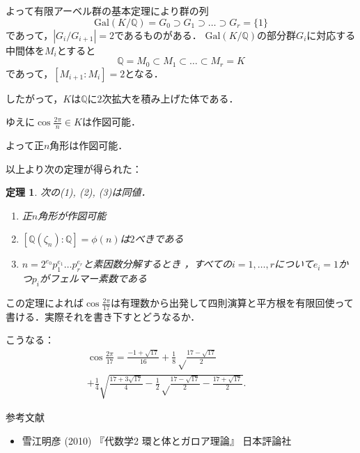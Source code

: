\documentclass[dvipdfmx,17pt]{beamer}
\theoremstyle{plain}
\newtheorem{thm}{定理}
\newcommand{\Q}{\mathbb{Q}}
\begin{document}
\begin{frame}
よって有限アーベル群の基本定理により群の列
\[\mathrm{Gal}(K/\Q) = G_0 \supset G_1 \supset \dots \supset G_r = \{1\}\]
であって，$|G_i/G_{i+1}| = 2$であるものがある．
$\mathrm{Gal}(K/\Q)$の部分群$G_i$に対応する中間体を$M_i$とすると
\[\Q = M_0 \subset M_1 \subset \dots \subset M_r = K\]
であって，$[M_{i+1}:M_i] = 2$となる．
\end{frame}

\begin{frame}
したがって，$K$は$\Q$に$2$次拡大を積み上げた体である．

ゆえに$\cos \frac{2 \pi}{n} \in K$は作図可能．

よって正$n$角形は作図可能．
\end{frame}

\begin{frame}
以上より次の定理が得られた：
\begin{thm}
次の(1), (2), (3)は同値．
\begin{enumerate}
\item 正$n$角形が作図可能
\item $[\Q(\zeta_n) : \Q] = \phi(n)$は$2$べきである
\item $n = 2^{e_0} p_1^{e_1} \dots p_r^{e_r}$と素因数分解するとき
，すべての$i = 1, \dots, r$について$e_i = 1$かつ$p_i$がフェルマー素数である
\end{enumerate}
\end{thm}
\end{frame}

\begin{frame}
この定理によれば$\cos \frac{2 \pi}{17}$は有理数から出発して四則演算と平方根を有限回使って書ける．実際それを書き下すとどうなるか．
\end{frame}

\begin{frame}
こうなる：
{\small 
\begin{align*}
\cos \frac{2 \pi}{17} = \frac{-1+\sqrt{17}}{16}+\frac{1}{8}\sqrt \frac{17-\sqrt {17}}{2}\qquad\qquad\qquad\\
+\frac{1}{4}\sqrt{\frac{17+3\sqrt{17}}{4}-\frac{1}{2}\sqrt \frac{17-\sqrt {17}}{2}-\frac{17+\sqrt {17}}{2}}.
\end{align*}}
\end{frame}

\begin{frame}{参考文献}

\begin{itemize}
\item 雪江明彦 (2010) 『代数学2 環と体とガロア理論』 日本評論社
\end{itemize}
\end{frame}
\end{document}
